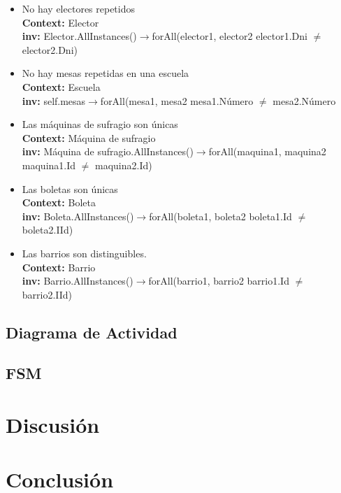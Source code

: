 \documentclass[spanish, 10pt,a4paper]{article}
\numberwithin{equation}{section} %
\begin{document}
\begin{itemize}
	\item No hay electores repetidos
\\	\textbf{Context: }  Elector
\\	\textbf{inv: } Elector.AllInstances()$\rightarrow$forAll(elector1, elector2 \textbar elector1.Dni $\neq$ elector2.Dni)

	\item No hay mesas repetidas en una escuela
\\	\textbf{Context: }  Escuela
\\	\textbf{inv: } self.mesas$\rightarrow$forAll(mesa1, mesa2 \textbar mesa1.Número $\neq$ mesa2.Número

	\item Las máquinas de sufragio son únicas
\\	\textbf{Context: }  Máquina de sufragio
\\	\textbf{inv: } Máquina de sufragio.AllInstances()$\rightarrow$forAll(maquina1, maquina2 \textbar maquina1.Id $\neq$ maquina2.Id)

	\item Las boletas son únicas
\\	\textbf{Context: }  Boleta
\\	\textbf{inv: } Boleta.AllInstances()$\rightarrow$forAll(boleta1, boleta2 \textbar boleta1.Id $\neq$ boleta2.IId)

	\item Las barrios son distinguibles.
\\	\textbf{Context: }  Barrio
\\	\textbf{inv: } Barrio.AllInstances()$\rightarrow$forAll(barrio1, barrio2 \textbar barrio1.Id $\neq$ barrio2.IId)
\end{itemize}

\subsection{Diagrama de Actividad}

\subsection{FSM}

\section{Discusión}
	
\section{Conclusión}

\end{document}
